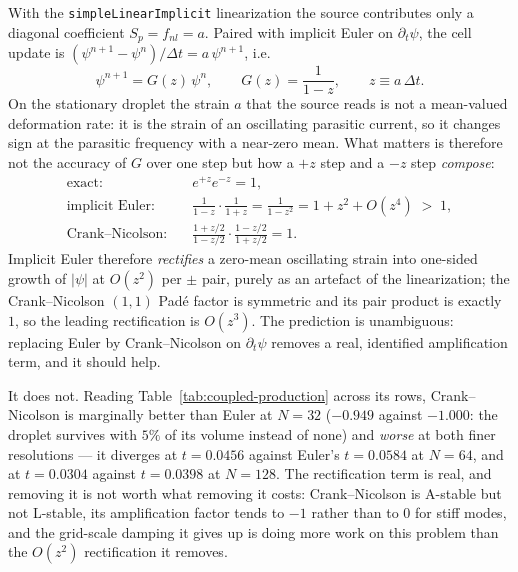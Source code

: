 \documentclass[preprint,3p,11pt]{elsarticle}
\newcommand{\psilev}{\psi}
\begin{document}
With the \texttt{simpleLinearImplicit} linearization the source contributes only
a diagonal coefficient $S_p = f_{nl} = a$. Paired with implicit Euler on
$\partial_t\psilev$, the cell update is
$(\psilev^{n+1} - \psilev^{n})/\Delta t = a\,\psilev^{n+1}$, i.e.
\begin{equation}
  \psilev^{n+1} = G(z)\,\psilev^{n}, \qquad G(z) = \frac{1}{1-z},
  \qquad z \equiv a\,\Delta t .
  \label{eq:amp}
\end{equation}
On the stationary droplet the strain $a$ that the source reads is not a
mean-valued deformation rate: it is the strain of an oscillating parasitic
current, so it changes sign at the parasitic frequency with a near-zero mean.
What matters is therefore not the accuracy of $G$ over one step but how a $+z$
step and a $-z$ step \emph{compose}:
\begin{equation}
  \begin{aligned}
    \text{exact:} \quad & e^{+z}e^{-z} = 1, \\
    \text{implicit Euler:} \quad & \frac{1}{1-z}\cdot\frac{1}{1+z}
      = \frac{1}{1-z^2} = 1 + z^2 + O(z^4) \;>\; 1, \\
    \text{Crank--Nicolson:} \quad &
      \frac{1+z/2}{1-z/2}\cdot\frac{1-z/2}{1+z/2} = 1 .
  \end{aligned}
  \label{eq:rectify}
\end{equation}
Implicit Euler therefore \emph{rectifies} a zero-mean oscillating strain into
one-sided growth of $|\psilev|$ at $O(z^2)$ per $\pm$ pair, purely as an artefact
of the linearization; the Crank--Nicolson $(1,1)$ Pad\'{e} factor is symmetric
and its pair product is exactly $1$, so the leading rectification is
$O(z^3)$. The prediction is unambiguous: replacing Euler by Crank--Nicolson on
$\partial_t\psilev$ removes a real, identified amplification term, and it should
help.

It does not. Reading Table~\ref{tab:coupled-production} across its rows,
Crank--Nicolson is marginally better than Euler at $N=32$ ($-0.949$ against
$-1.000$: the droplet survives with $5\%$ of its volume instead of none) and
\emph{worse} at both finer resolutions --- it diverges at $t=0.0456$ against
Euler's $t=0.0584$ at $N=64$, and at $t=0.0304$ against $t=0.0398$ at $N=128$.
The rectification term is real, and removing it is not worth what removing it
costs: Crank--Nicolson is A-stable but not L-stable, its amplification factor
tends to $-1$ rather than to $0$ for stiff modes, and the grid-scale damping it
gives up is doing more work on this problem than the $O(z^2)$ rectification it
removes.
\end{document}
